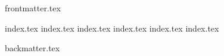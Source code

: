 \documentclass[]{template/lnucmthesis}
\begin{document}
\raggedright
\frontmatter
  {frontmatter.tex}
 
\mainmatter
  {index.tex}
  {index.tex}
  {index.tex}
  {index.tex}
  {index.tex}
  {index.tex}

\backmatter
  {backmatter.tex}
\end{document}
